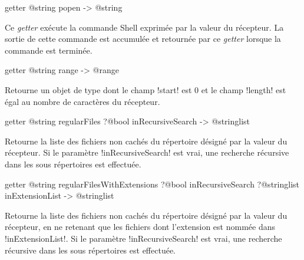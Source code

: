 \begin{galgas3box}
getter @string popen -> @string
\end{galgas3box}

Ce \emph{getter} exécute la commande Shell exprimée par la valeur du récepteur. La sortie de cette commande est accumulée et retournée par ce \emph{getter} lorsque la commande est terminée.









\begin{galgas3box}
getter @string range -> @range
\end{galgas3box}

Retourne un objet de type  dont le champ \ggst!start! est $0$ et le champ \ggst!length! est égal au nombre de caractères du récepteur.









\begin{galgas3box}
getter @string regularFiles ?@bool inRecursiveSearch -> @stringlist
\end{galgas3box}

Retourne la liste des fichiers non cachés du répertoire désigné par la valeur du récepteur. Si le paramètre \ggst!inRecursiveSearch! est vrai, une recherche récursive dans les sous répertoires est effectuée.










\begin{galgas3box}
getter @string regularFilesWithExtensions
    ?@bool inRecursiveSearch
    ?@stringlist inExtensionList -> @stringlist
\end{galgas3box}

Retourne la liste des fichiers non cachés du répertoire désigné par la valeur du récepteur, en ne retenant que les fichiers dont l'extension est nommée dans \ggst!inExtensionList!. Si le paramètre \ggst!inRecursiveSearch! est vrai, une recherche récursive dans les sous répertoires est effectuée.









